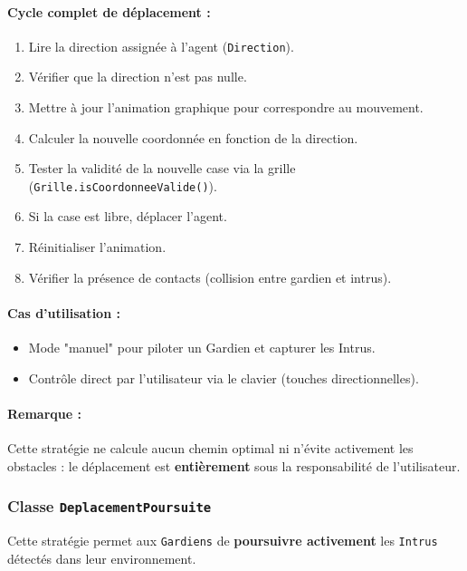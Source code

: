 \paragraph{Cycle complet de déplacement :}
\begin{enumerate}
    \item Lire la direction assignée à l'agent (\texttt{Direction}).
    \item Vérifier que la direction n'est pas nulle.
    \item Mettre à jour l'animation graphique pour correspondre au mouvement.
    \item Calculer la nouvelle coordonnée en fonction de la direction.
    \item Tester la validité de la nouvelle case via la grille (\texttt{Grille.isCoordonneeValide()}).
    \item Si la case est libre, déplacer l'agent.
    \item Réinitialiser l'animation.
    \item Vérifier la présence de contacts (collision entre gardien et intrus).
\end{enumerate}

\paragraph{Cas d'utilisation :}
\begin{itemize}
    \item Mode "manuel" pour piloter un Gardien et capturer les Intrus.
    \item Contrôle direct par l'utilisateur via le clavier (touches directionnelles).
\end{itemize}


\paragraph{Remarque :}
Cette stratégie ne calcule aucun chemin optimal ni n'évite activement les obstacles :
le déplacement est \textbf{entièrement} sous la responsabilité de l'utilisateur.

\subsubsection{ Classe \texttt{DeplacementPoursuite}}

Cette stratégie permet aux \texttt{Gardiens} de \textbf{poursuivre activement} les \texttt{Intrus} détectés dans leur environnement.

